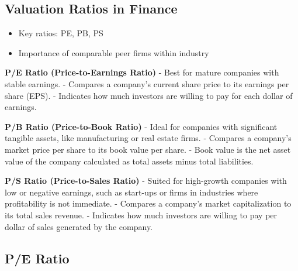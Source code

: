 \documentclass[
]{book}
\providecommand{\tightlist}{%
  \setlength{\itemsep}{0pt}\setlength{\parskip}{0pt}}
\begin{document}
\hypertarget{valuation-ratios-in-finance}{%
\subsection{Valuation Ratios in Finance}\label{valuation-ratios-in-finance}}

\begin{itemize}
\tightlist
\item
  Key ratios: PE, PB, PS
\item
  Importance of comparable peer firms within industry
\end{itemize}

\textbf{P/E Ratio (Price-to-Earnings Ratio)}
- Best for mature companies with stable earnings.
- Compares a company's current share price to its earnings per share (EPS).
- Indicates how much investors are willing to pay for each dollar of earnings.

\textbf{P/B Ratio (Price-to-Book Ratio)}
- Ideal for companies with significant tangible assets, like manufacturing or real estate firms.
- Compares a company's market price per share to its book value per share.
- Book value is the net asset value of the company calculated as total assets minus total liabilities.

\textbf{P/S Ratio (Price-to-Sales Ratio)}
- Suited for high-growth companies with low or negative earnings, such as start-ups or firms in industries where profitability is not immediate.
- Compares a company's market capitalization to its total sales revenue.
- Indicates how much investors are willing to pay per dollar of sales generated by the company.

\hypertarget{pe-ratio}{%
\subsection{P/E Ratio}\label{pe-ratio}}
\end{document}
